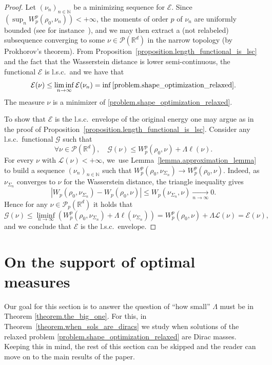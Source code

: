 \documentclass[10pt]{amsart}
\theoremstyle{definition}
\newcommand\E{\mathcal{E}}
\newcommand\G{\mathcal{G}}
\newcommand{\RR}{\mathbb{R}}
\begin{document}
\begin{proof}
Let $\left(\nu_n\right)_{n \in \mathbb{N}}$ be a minimizing sequence for $\mathcal{E}$. Since $\left(\sup_n W_p^p(\rho_0, \nu_n)\right)<+\infty$, the moments of order $p$ of $\nu_n$ are uniformly bounded (see for instance~\cite[Th.\,5.11]{santambrogio2015optimal}), and we may then extract a (not relabeled) subsequence converging to some $\nu \in \mathcal{P}(\RR^d)$ in the narrow topology (by Prokhorov's theorem). From Proposition~\ref{proposition.length_functional_is_lsc} and the fact that the Wasserstein distance is lower semi-continuous, the functional $\mathcal{E}$ is l.s.c.~and we have that
\[
\mathcal{E}(\nu) \le \liminf_{n \to \infty} \mathcal{E}(\nu_n) = \inf \eqref{problem.shape_optimization_relaxed}.
\]
The measure $\nu$ is a minimizer of \eqref{problem.shape_optimization_relaxed}.

To show that $\E$ is the l.s.c.~envelope of the original energy one may argue as in the proof of Proposition~\ref{proposition.length_functional_is_lsc}. Consider any l.s.c.~functional $\G$ such that
\begin{equation*}
\forall \nu \in \mathcal{P}(\RR^d),\quad \G(\nu)\leq W_p^p(\rho_0,\nu) +\Lambda \ell(\nu).
\end{equation*}
For every $\nu$ with $\mathcal{L}(\nu)<+\infty$, we~use Lemma~\ref{lemma.approximation_lemma} to build a sequence $(\nu_n)_{n \in \mathbb{N}}$ such that $W_p^p(\rho_0,\nu_{\Sigma_n}) \to W_p^p(\rho_0,\nu)$. Indeed, as $\nu_{\Sigma_n}$ converges to $\nu$ for the Wasserstein distance, the triangle inequality gives
\[
\left|
W_p(\rho_0, \nu_{\Sigma_n}) - W_p(\rho_0, \nu)
\right|
\le
W_p(\nu_{\Sigma_n}, \nu) \xrightarrow[n \to \infty]{} 0.
\]
Hence for any $\nu \in \mathcal{P}_p(\RR^d)$ it holds that
\begin{equation*}
\G(\nu)\leq \liminf_{n \to \infty} \left(W_p^p(\rho_0,\nu_{\Sigma_n})
+
\Lambda \ell(\nu_{\Sigma_n})\right)= W_p^p(\rho_0,\nu) +\Lambda \mathcal{L}(\nu)=\E(\nu),
\end{equation*}
and we conclude that $\mathcal{E}$ is the l.s.c.~envelope.
\end{proof}

\section{On the support of optimal measures}\label{section.geometric_properties_transport_map}
Our goal for this section is to answer the question of ``how small'' $\Lambda$ must be in Theorem \ref{theorem.the_big_one}. For this, in Theorem~\ref{theorem.when_sols_are_diracs} we study when solutions of the relaxed problem \eqref{problem.shape_optimization_relaxed} are Dirac masses. Keeping this in mind, the rest of this section can be skipped and the reader can move on to the main results of the paper.
\end{document}
